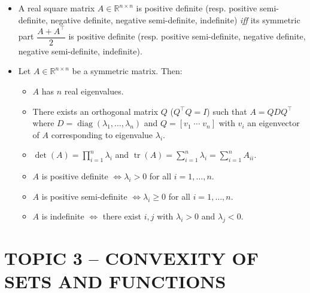 \documentclass[12pt]{article}
\begin{document}
\begin{itemize}
\begin{itemize}
  \end{itemize}
  \item A real square matrix $A\in\mathbb{R}^{n\times n}$ is positive definite (resp. positive semi-definite, negative definite, negative semi-definite, indefinite) \emph{iff} its symmetric part $\dfrac{A+A^{\top}}{2}$ is positive definite (resp. positive semi-definite, negative definite, negative semi-definite, indefinite).
  \item Let $A\in\mathbb{R}^{n\times n}$ be a symmetric matrix. Then:
  \begin{itemize}
    \item $A$ has $n$ real eigenvalues.
    \item There exists an orthogonal matrix $Q$ ($Q^{\top}Q=I$) such that $A=QDQ^{\top}$ where $D=\operatorname{diag}(\lambda_1,\ldots,\lambda_n)$ and $Q=[v_1\;\cdots\;v_n]$ with $v_i$ an eigenvector of $A$ corresponding to eigenvalue $\lambda_i$.
    \item $\det(A)=\prod_{i=1}^n \lambda_i$ and $\operatorname{tr}(A)=\sum_{i=1}^n \lambda_i=\sum_{i=1}^n A_{ii}$.
    \item $A$ is positive definite $\Leftrightarrow \lambda_i>0$ for all $i=1,\ldots,n$.
    \item $A$ is positive semi-definite $\Leftrightarrow \lambda_i\ge 0$ for all $i=1,\ldots,n$.
    \item $A$ is indefinite $\Leftrightarrow$ there exist $i,j$ with $\lambda_i>0$ and $\lambda_j<0$.
  \end{itemize}
\end{itemize}

\bigskip
\section*{TOPIC 3 -- CONVEXITY OF SETS AND FUNCTIONS}
\end{document}
